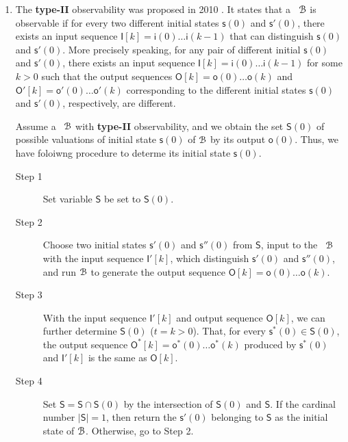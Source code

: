 \begin{enumerate}
\begin{description}
\end{description}
\item The  {\bf type-II} observability was proposed in 2010 \cite{Zhao2010Input}. It states that a \BCN\ ${\mathcal{B}}$ is observable if for every two different initial states $\mathsf{s}(0)$ and $\mathsf{s}'(0)$, there exists an input sequence $\mathsf{I}[k]=\mathsf{i}(0)\ldots\mathsf{i}(k-1)$ that can distinguish $\mathsf{s}(0)$ and $\mathsf{s}'(0)$. More precisely speaking,  for any pair of different initial  $\mathsf{s}(0)$ and $\mathsf{s}'(0)$, there exists an input sequence  $\mathsf{I}[k]=\mathsf{i}(0)\ldots\mathsf{i}(k-1)$ for some $k>0$ such that the output sequences $\mathsf{O}[k]=\mathsf{o}(0)\ldots\mathsf{o}(k)$ and  $\mathsf{O}'[k]=\mathsf{o}'(0)\ldots\mathsf{o}'(k)$ corresponding to  the different initial states  $\mathsf{s}(0)$ and $\mathsf{s}'(0)$, respectively, are different.
	
	Assume a \BCN\ ${\mathcal{B}}$  with {\bf type-II}  observability, and we obtain the set $\mathsf{S}(0)$ of possible valuations of initial state $\mathsf{s}(0)$ of ${\mathcal{B}}$ by its output $\mathsf{o}(0)$. 
	Thus, we have foloiwng procedure to determe its initial state $\mathsf{s}(0)$.
\begin{description}
	\item[Step 1]  Set variable $\mathsf{S}$ be set to $\mathsf{S}(0)$.
	\item[Step 2] Choose two initial states $\mathsf{s}'(0)$ and $\mathsf{s}''(0)$ from $\mathsf{S}$, input to the \BCN\ ${\mathcal{B}}$ with the input sequence $\mathsf{I}'[k]$, which distinguish $\mathsf{s}'(0)$ and $\mathsf{s}''(0)$, and run ${\mathcal{B}}$ to generate the output sequence $\mathsf{O}[k]=\mathsf{o}(0)\ldots\mathsf{o}(k)$.
	\item[Step 3] With the input sequence $\mathsf{I}'[k]$ and output sequence $\mathsf{O}[k]$, we can further determine $\mathsf{S}(0)$ ($t=k>0$). That, for every $\mathsf{s}^*(0)\in\mathsf{S}(0)$, the output sequence $\mathsf{O}^*[k]=\mathsf{o}^*(0)\ldots\mathsf{o}^*(k)$ produced by $\mathsf{s}^*(0)$ and $\mathsf{I}'[k]$ is the same as $\mathsf{O}[k]$.
	\item[Step 4] Set $\mathsf{S}=\mathsf{S}\cap\mathsf{S}(0)$ by the intersection of $\mathsf{S}(0)$ and $\mathsf{S}$. If the cardinal number $|\mathsf{S}|=1$, then return the $\mathsf{s}'(0)$ belonging to $\mathsf{S}$ as the initial state of ${\mathcal{B}}$. Otherwise, go to Step 2.
\end{description}
	

\end{enumerate}

